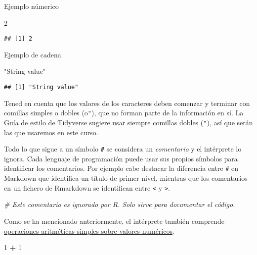 \documentclass[
]{book}
\newenvironment{Shaded}{\begin{snugshade}}{\end{snugshade}}
\newcommand{\CommentTok}[1]{\textcolor[rgb]{0.56,0.35,0.01}{\textit{#1}}}
\newcommand{\DecValTok}[1]{\textcolor[rgb]{0.00,0.00,0.81}{#1}}
\newcommand{\OperatorTok}[1]{\textcolor[rgb]{0.81,0.36,0.00}{\textbf{#1}}}
\newcommand{\StringTok}[1]{\textcolor[rgb]{0.31,0.60,0.02}{#1}}
\begin{document}
Ejemplo númerico

\begin{Shaded}
\begin{Highlighting}[]
\DecValTok{2}
\end{Highlighting}
\end{Shaded}

\begin{verbatim}
## [1] 2
\end{verbatim}

Ejemplo de cadena

\begin{Shaded}
\begin{Highlighting}[]
\StringTok{"String value"}
\end{Highlighting}
\end{Shaded}

\begin{verbatim}
## [1] "String value"
\end{verbatim}

Tened en cuenta que los valores de los caracteres deben comenzar y terminar con comillas simples o dobles (\texttt{\textquotesingle{}}o\texttt{"}), que no forman parte de la información en sí. La \href{https://style.tidyverse.org\%20/syntax.html}{Guía de estilo de Tidyverse} sugiere usar siempre comillas dobles (\texttt{"}), así que serán las que usaremos en este curso.

Todo lo que sigue a un símbolo \texttt{\#} se considera un \emph{comentario} y el intérprete lo ignora. Cada lenguaje de programación puede usar sus propios símbolos para identificar los comentarios. Por ejemplo cabe destacar la diferencia entre \texttt{\#} en Markdown que identifica un título de primer nivel, mientras que los comentarios en un fichero de Rmarkdown se identifican entre \texttt{\textless{}} y \texttt{\textgreater{}}.

\begin{Shaded}
\begin{Highlighting}[]
\CommentTok{# Este comentario es ignorado por R. Solo sirve para documentar el código.}
\end{Highlighting}
\end{Shaded}

Como se ha mencionado anteriormente, el intérprete también comprende \href{https://stat.ethz.ch/R-manual/R-devel/library/base/html/Arithmetic.html}{operaciones aritméticas simples sobre valores numéricos}.

\begin{Shaded}
\begin{Highlighting}[]
\DecValTok{1} \OperatorTok{+}\StringTok{ }\DecValTok{1}
\end{Highlighting}
\end{Shaded}
\end{document}
